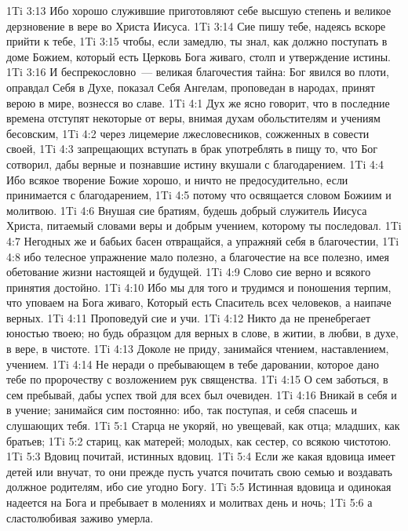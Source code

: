 \vs 1Ti 3:13 Ибо хорошо служившие приготовляют себе высшую степень и великое дерзновение в вере во Христа Иисуса.
\rsbpar\vs 1Ti 3:14 Сие пишу тебе, надеясь вскоре прийти к тебе,
\vs 1Ti 3:15 чтобы, если замедлю, ты знал, как должно поступать в доме Божием, который есть Церковь Бога живаго, столп и утверждение истины.
\vs 1Ti 3:16 И беспрекословно~--- великая благочестия тайна: Бог явился во плоти, оправдал Себя в Духе, показал Себя Ангелам, проповедан в народах, принят верою в мире, вознесся во славе.
\vs 1Ti 4:1 Дух же ясно говорит, что в последние времена отступят некоторые от веры, внимая духам обольстителям и учениям бесовским,
\vs 1Ti 4:2 через лицемерие лжесловесников, сожженных в совести своей,
\vs 1Ti 4:3 запрещающих вступать в брак  употреблять в пищу то, что Бог сотворил, дабы верные и познавшие истину вкушали с благодарением.
\vs 1Ti 4:4 Ибо всякое творение Божие хорошо, и ничто не предосудительно, если принимается с благодарением,
\vs 1Ti 4:5 потому что освящается словом Божиим и молитвою.
\rsbpar\vs 1Ti 4:6 Внушая сие братиям, будешь добрый служитель Иисуса Христа, питаемый словами веры и добрым учением, которому ты последовал.
\vs 1Ti 4:7 Негодных же и бабьих басен отвращайся, а упражняй себя в благочестии,
\vs 1Ti 4:8 ибо телесное упражнение мало полезно, а благочестие на все полезно, имея обетование жизни настоящей и будущей.
\vs 1Ti 4:9 Слово сие верно и всякого принятия достойно.
\vs 1Ti 4:10 Ибо мы для того и трудимся и поношения терпим, что уповаем на Бога живаго, Который есть Спаситель всех человеков, а наипаче верных.
\vs 1Ti 4:11 Проповедуй сие и учи.
\vs 1Ti 4:12 Никто да не пренебрегает юностью твоею; но будь образцом для верных в слове, в житии, в любви, в духе, в вере, в чистоте.
\vs 1Ti 4:13 Доколе не приду, занимайся чтением, наставлением, учением.
\vs 1Ti 4:14 Не неради о пребывающем в тебе даровании, которое дано тебе по пророчеству с возложением рук священства.
\vs 1Ti 4:15 О сем заботься, в сем пребывай, дабы успех твой для всех был очевиден.
\vs 1Ti 4:16 Вникай в себя и в учение; занимайся сим постоянно: ибо, так поступая, и себя спасешь и слушающих тебя.
\vs 1Ti 5:1 Старца не укоряй, но увещевай, как отца; младших, как братьев;
\vs 1Ti 5:2 стариц, как матерей; молодых, как сестер, со всякою чистотою.
\vs 1Ti 5:3 Вдовиц почитай, истинных вдовиц.
\vs 1Ti 5:4 Если же какая вдовица имеет детей или внучат, то они прежде пусть учатся почитать свою семью и воздавать должное родителям, ибо сие угодно Богу.
\vs 1Ti 5:5 Истинная вдовица и одинокая надеется на Бога и пребывает в молениях и молитвах день и ночь;
\vs 1Ti 5:6 а сластолюбивая заживо умерла.
